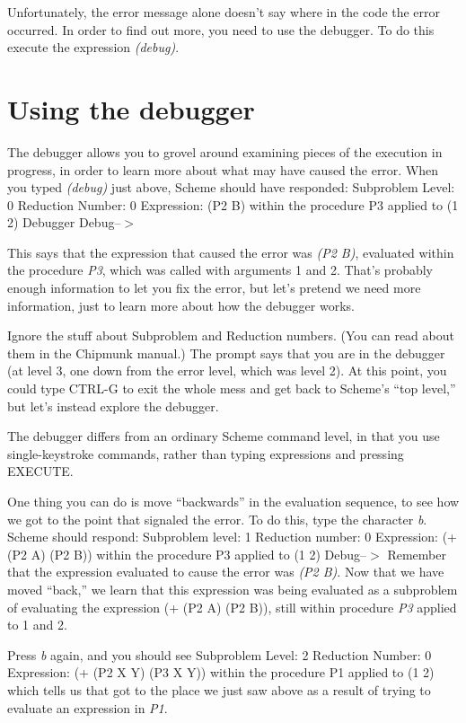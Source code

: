Unfortunately, the error message alone doesn't say where in
the code the error occurred.  In order to find out more, you need
to use the debugger.  To do this execute the expression {\it (debug)}.

\section{Using the debugger}

The debugger allows you to grovel around
examining pieces of the execution in progress, in order to learn
more about what may have caused the error.
When you typed {\it (debug)} just above, Scheme should have responded:
\beginlisp
Subproblem Level: 0  Reduction Number: 0
Expression:
(P2 B)
within the procedure P3
applied to (1 2)
Debugger
 Debug--$>$
\endlisp

This says that the expression that caused the error was
{\it (P2 B)}, evaluated within the procedure {\it P3}, which was
called with arguments 1 and 2.  That's probably enough
information to let you fix the error, but let's pretend we need
more information, just to learn more about how the debugger works.

Ignore the stuff about Subproblem and Reduction numbers.  (You can
read about them in the Chipmunk manual.)  The prompt says that you are
in the debugger (at level 3, one down from the error level, which was
level 2).  At this point, you could type CTRL-G to exit the whole
mess and get back to Scheme's ``top level,'' but let's instead explore
the debugger.

The debugger differs from an ordinary Scheme command level, in
that you use single-keystroke commands, rather than typing expressions
and pressing EXECUTE.


One thing you can do is move ``backwards'' in the evaluation
sequence, to see how we got to the point that signaled the error.
To do this, type the character {\it b}.  Scheme should respond:
\beginlisp
Subproblem level: 1 Reduction number: 0
Expression:
(+ (P2 A) (P2 B))
within the procedure P3
applied to (1 2)
 Debug--$>$
\endlisp
Remember that the expression evaluated to cause the error was {\it (P2
B)}.  Now that we have moved ``back,'' we learn that this expression
was being evaluated as a subproblem of evaluating the expression
\beginlisp(+ (P2 A) (P2 B))\endlisp, still within procedure {\it P3}
applied to 1 and 2.

Press {\it b} again, and you should see
\beginlisp
Subproblem Level: 2  Reduction Number: 0
Expression:
(+ (P2 X Y) (P3 X Y))
within the procedure P1
applied to (1 2)
\endlisp
which tells us that got to the place we just
saw above as a result of trying to evaluate an expression in
{\it P1}.

